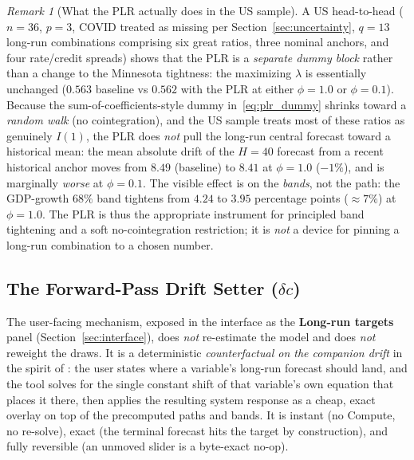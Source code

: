 \documentclass[11pt]{article}
\theoremstyle{definition}
\theoremstyle{remark}
\newtheorem{remark}{Remark}
\begin{document}
\begin{remark}[What the PLR actually does in the US sample]
\label{rem:plr_findings}
A US head-to-head ($n=36$, $p=3$, COVID treated as missing per
Section~\ref{sec:uncertainty}, $q=13$ long-run combinations comprising
six great ratios, three nominal anchors, and four rate/credit spreads)
shows that the PLR is a \emph{separate dummy block} rather than a change
to the Minnesota tightness: the maximizing $\lambda$ is essentially
unchanged ($0.563$ baseline vs $0.562$ with the PLR at either
$\phi=1.0$ or $\phi=0.1$). Because the sum-of-coefficients-style dummy
in~\eqref{eq:plr_dummy} shrinks toward a \emph{random walk} (no
cointegration), and the US sample treats most of these ratios as
genuinely $I(1)$, the PLR does \emph{not} pull the long-run central
forecast toward a historical mean: the mean absolute drift of the
$H{=}40$ forecast from a recent historical anchor moves from $8.49$
(baseline) to $8.41$ at $\phi=1.0$ ($-1\%$), and is marginally
\emph{worse} at $\phi=0.1$. The visible effect is on the \emph{bands},
not the path: the GDP-growth $68\%$ band tightens from $4.24$ to
$3.95$ percentage points ($\approx 7\%$) at $\phi=1.0$. The PLR is thus
the appropriate instrument for principled band tightening and a soft
no-cointegration restriction; it is \emph{not} a device for pinning a
long-run combination to a chosen number.
\end{remark}

\subsection{The Forward-Pass Drift Setter ($\delta c$)}\label{sec:driftsetter}

The user-facing mechanism, exposed in the interface as the
\textbf{Long-run targets} panel (Section~\ref{sec:interface}), does
\emph{not} re-estimate the model and does \emph{not} reweight the draws.
It is a deterministic \emph{counterfactual on the companion drift} in
the spirit of \citet{Villani2009}: the user states where a variable's
long-run forecast should land, and the tool solves for the single
constant shift of that variable's own equation that places it there,
then applies the resulting system response as a cheap, exact overlay on
top of the precomputed paths and bands. It is instant (no Compute, no
re-solve), exact (the terminal forecast hits the target by
construction), and fully reversible (an unmoved slider is a byte-exact
no-op).
\end{document}
